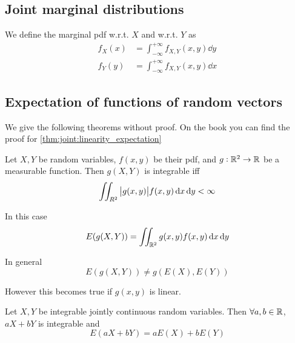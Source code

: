 \documentclass[14pt]{extarticle}
\begin{document}
\subsection{Joint marginal distributions}

\begin{definition}
    We define the marginal pdf w.r.t. $X$ and w.r.t. $Y$ as
    \begin{align}
        f_X(x) & = \int_{-\infty}^{+\infty} f_{X, Y}(x, y) \dd{y} \\
        f_Y(y) & = \int_{-\infty}^{+\infty} f_{X, Y}(x, y) \dd{x}
    \end{align}
\end{definition}

\subsection{Expectation of functions of random vectors}

We give the following theorems without proof.
On the book you can find the proof for \autoref{thm:joint:linearity_expectation}

\begin{theorem}
    Let $X, Y$ be random variables, $f(x,y)$ be their pdf, and $g: \mathbb{R}^2 \to \mathbb{R}$ be a measurable function.
    Then $g(X, Y)$ is integrable iff
    \begin{equation}
        \iint_{R^2} \abs{g(x, y)}f(x, y) \dd{x} \dd{y} < \infty
    \end{equation}

    In this case
    \begin{equation}
        E(g(X, Y)) = \iint_{\mathbb{R}^2} g(x, y)f(x, y) \dd{x} \dd{y}
    \end{equation}
\end{theorem}

\begin{remark}
    In general
    \begin{equation}
        E(g(X, Y)) \ne g(E(X), E(Y))
    \end{equation}

    However this becomes true if $g(x, y)$ is linear.
\end{remark}

\begin{theorem}
    \label{thm:joint:linearity_expectation}

    Let $X, Y$ be integrable jointly continuous random variables.
    Then $\forall a, b \in \mathbb{R}$, $aX + bY$ is integrable and
    \begin{equation}
        E(aX + bY) = aE(X) + bE(Y)
    \end{equation}
\end{theorem}
\end{document}

